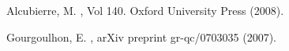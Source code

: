 \begin{thebibliography}{2}

  Alcubierre, M.
  , Vol 140. Oxford University Press (2008).

  Gourgoulhon, E.
  , arXiv preprint gr-qc/0703035 (2007).

\end{thebibliography}



